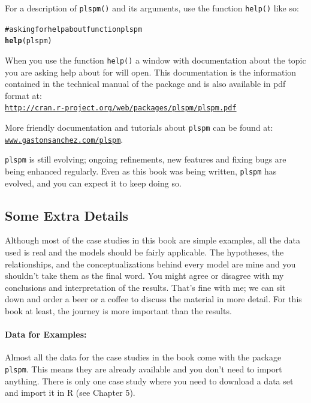 \documentclass[12pt]{book}\usepackage{graphicx, color}
\makeatletter
\newcommand{\hlfunctioncall}[1]{\textcolor[rgb]{0.501960784313725,0,0.329411764705882}{\textbf{#1}}}%
\newcommand{\hlcomment}[1]{\textcolor[rgb]{0.180392156862745,0.6,0.341176470588235}{#1}}%
\newenvironment{kframe}{%
 \def\at@end@of@kframe{}%
 \ifinner\ifhmode%
  \def\at@end@of@kframe{\end{minipage}}%
  \begin{minipage}{\columnwidth}%
 \fi\fi%
 \def\FrameCommand##1{\hskip\@totalleftmargin \hskip-\fboxsep
 \colorbox{shadecolor}{##1}\hskip-\fboxsep
     \hskip-\linewidth \hskip-\@totalleftmargin \hskip\columnwidth}%
 \MakeFramed {\advance\hsize-\width
   \@totalleftmargin\z@ \linewidth\hsize
   \@setminipage}}%
 {\par\unskip\endMakeFramed%
 \at@end@of@kframe}
\newenvironment{knitrout}{}{} %
\newcommand{\plspm}{\texttt{plspm}}
\newcommand{\fplspm}{\texttt{plspm()}}
\newcommand{\code}[1]{\texttt{#1}}
\makeatother
\begin{document}
For a description of \fplspm{} and its arguments, use the function \code{help()} like so:
\begin{knitrout}
\color{fgcolor}\begin{kframe}
\begin{alltt}
\hlcomment{# asking for help about function plspm}
\hlfunctioncall{help}(plspm)
\end{alltt}
\end{kframe}
\end{knitrout}

When you use the function \code{help()} a window with documentation about the topic you are asking help about for will open. This documentation is the information contained in the technical manual of the package and is also available in pdf format at: \\
\texttt{\href{http://cran.r-project.org/web/packages/plspm/plspm.pdf}{http://cran.r-project.org/web/packages/plspm/plspm.pdf}}

More friendly documentation and tutorials about \plspm{} can be found at: \\
\texttt{\href{http://www.gastonsanchez.com/plspm}{www.gastonsanchez.com/plspm}}. 

\plspm{} is still evolving; ongoing refinements, new features and fixing bugs are being enhanced regularly. Even as this book was being written, \plspm{} has evolved, and you can expect it to keep doing so.




\subsection{Some Extra Details}
Although most of the case studies in this book are simple examples, all the data used is real and the models should be fairly applicable. The hypotheses, the relationships, and the conceptualizations behind every model are mine and you shouldn't take them as the final word. You might agree or disagree with my conclusions and interpretation of the results. That's fine with me; we can sit down and order a beer or a coffee to discuss the material in more detail. For this book at least, the journey is more important than the results.

\paragraph{Data for Examples:} Almost all the data for the case studies in the book come with the package \plspm{}. This means they are already available and you don't need to import anything. There is only one case study where you need to download a data set and import it in R (see Chapter 5).
\end{document}
